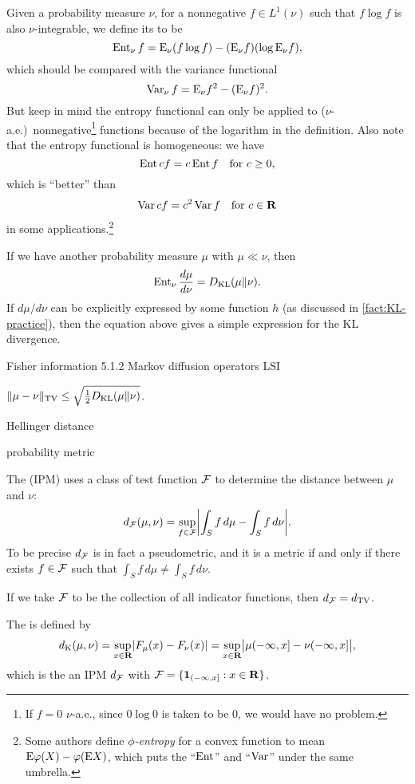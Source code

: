 Given a probability measure $\nu$, for a nonnegative $f \in L^1(\nu)$ such that $f \log f$ is also $\nu$-integrable, we define its  to be \[
    \operatorname{Ent}_\nu f = \mathop{}\!\mathrm{E}_\nu (f\log f) - (\mathop{}\!\mathrm{E}_\nu f)(\log \mathop{}\!\mathrm{E}_\nu f),
\] which should be compared with the variance functional \[
    \operatorname{Var}_\nu f = \mathop{}\!\mathrm{E}_\nu f^2 - (\mathop{}\!\mathrm{E}_\nu f)^2.
\] But keep in mind the entropy functional can only be applied to ($\nu$-a.e.)\ nonnegative\footnote{If $f = 0$ $\nu$-a.e., since $0\log 0$ is taken to be $0$, we would have no problem.} functions because of the logarithm in the definition. Also note that the entropy functional is homogeneous: we have \[
    \operatorname{Ent} cf = c\operatorname{Ent} f \quad \text{for } c\geq 0,
\] which is ``better'' than \[
    \operatorname{Var} cf = c^2 \operatorname{Var} f \quad \text{for }c\in \mathbf{R}
\] in some applications.\footnote{Some authors define \emph{$\phi$-entropy} for a convex function to mean $\mathop{}\!\mathrm{E} \varphi(X) - \varphi(\mathop{}\!\mathrm{E} X)$, which puts the ``$\operatorname{Ent}$'' and ``$\operatorname{Var}$'' under the same umbrella.}

If we have another probability measure $\mu$ with $\mu \ll \nu$, then \[
    \operatorname{Ent}_\nu \frac{d\mu}{d\nu} = D_{\mathrm{KL}}(\mu\Vert \nu).
\] If $d\mu/d\nu$ can be explicitly expressed by some function $h$ (as discussed in \cref{fact:KL-practice}), then the equation above gives a simple expression for the KL divergence.

Fisher information 5.1.2 Markov diffusion operators LSI

\begin{namedthm}
    $\lVert \mu - \nu \rVert_{\mathrm{TV}} \leq \sqrt{\frac 1 2 D_{\mathrm{KL}}(\mu\Vert \nu)}$.
\end{namedthm}

Hellinger distance

probability metric

The  (IPM) uses a class of test function $\mathcal{F}$ to determine the distance between $\mu$ and $\nu$: \[
    d_{\mathcal{F}}(\mu,\nu) = \sup_{f \in \mathcal{F}} \biggl\vert \int_S f\,d\mu - \int_S f\,d\nu \bigg\vert.
\] To be precise $d_{\mathcal{F}}$ is in fact a pseudometric, and it is a metric if and only if there exists $f \in \mathcal{F}$ such that $\int_S f \,d\mu \neq \int_S f\,d\nu$.

If we take $\mathcal{F}$ to be the collection of all indicator functions, then $d_{\mathcal{F}} = d_\mathrm{TV}$.

The  is defined by \[
    d_{\mathrm{K}}(\mu,\nu) = \sup_{x\in \mathbf{R}} \lvert F_\mu(x) - F_\nu(x) \rvert = \sup_{x\in \mathbf{R}}\bigl\vert\mu(-\infty,x] - \nu(-\infty,x]\bigr\vert,
\] which is the an IPM $d_{\mathcal{F}}$ with $\mathcal{F} = \{\mathbf{1}_{(-\infty,x]} : x\in \mathbf{R}\}$.

